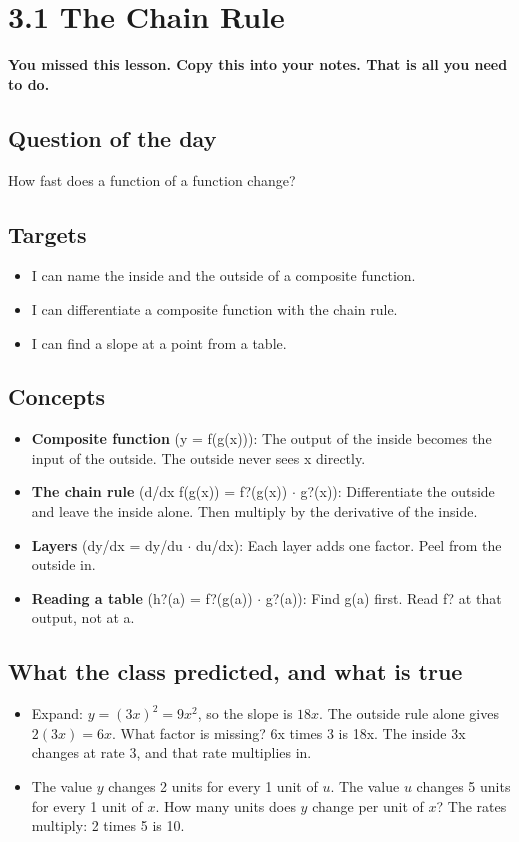 \documentclass[11pt]{article}
\begin{document}
\section*{3.1 The Chain Rule}
\textbf{You missed this lesson. Copy this into your notes. That is all you need to do.}\par\medskip
\subsection*{Question of the day}
How fast does a function of a function change?\par
\subsection*{Targets}\begin{itemize}\item I can name the inside and the outside of a composite function.
\item I can differentiate a composite function with the chain rule.
\item I can find a slope at a point from a table.\end{itemize}
\subsection*{Concepts}\begin{itemize}
\item \textbf{Composite function} (y = f(g(x))): The output of the inside becomes the input of the outside. The outside never sees x directly.
\item \textbf{The chain rule} (d/dx f(g(x)) = f?(g(x)) $\cdot$ g?(x)): Differentiate the outside and leave the inside alone. Then multiply by the derivative of the inside.
\item \textbf{Layers} (dy/dx = dy/du $\cdot$ du/dx): Each layer adds one factor. Peel from the outside in.
\item \textbf{Reading a table} (h?(a) = f?(g(a)) $\cdot$ g?(a)): Find g(a) first. Read f? at that output, not at a.
\end{itemize}
\subsection*{What the class predicted, and what is true}\begin{itemize}
\item Expand: $y=(3x)^2=9x^2$, so the slope is $18x$. The outside rule alone gives $2(3x)=6x$. What factor is missing?  6x times 3 is 18x. The inside 3x changes at rate 3, and that rate multiplies in.
\item The value $y$ changes 2 units for every 1 unit of $u$. The value $u$ changes 5 units for every 1 unit of $x$. How many units does $y$ change per unit of $x$?  The rates multiply: 2 times 5 is 10.
\end{itemize}
\end{document}
